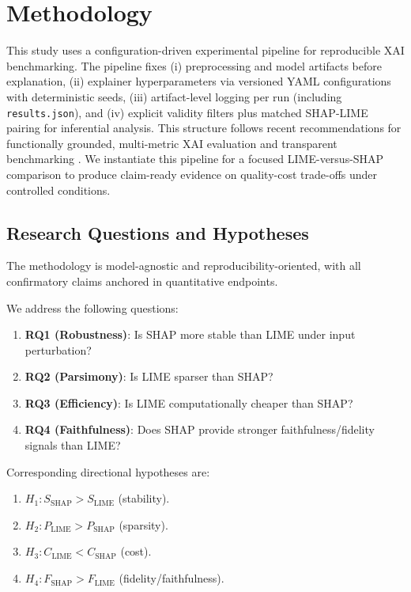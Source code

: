 \documentclass[twoside,11pt]{article}
\begin{document}
\section{Methodology}
This study uses a configuration-driven experimental pipeline for
reproducible XAI benchmarking. The pipeline fixes (i) preprocessing and
model artifacts before explanation, (ii) explainer hyperparameters via
versioned YAML configurations with deterministic seeds, (iii)
artifact-level logging per run (including \texttt{results.json}), and
(iv) explicit validity filters plus matched SHAP-LIME pairing for
inferential analysis. This structure follows recent recommendations for
functionally grounded, multi-metric XAI evaluation and transparent
benchmarking
\citep{canha2025benchmark,pawlicki2024metrics,agarwal2022openxai}. We
instantiate this pipeline for a focused LIME-versus-SHAP comparison to
produce claim-ready evidence on quality-cost trade-offs under controlled
conditions.

\subsection{Research Questions and Hypotheses}
The methodology is model-agnostic and reproducibility-oriented, with
all confirmatory claims anchored in quantitative endpoints.

We address the following questions:
\begin{enumerate}[leftmargin=*]
\item \textbf{RQ1 (Robustness)}: Is SHAP more stable than LIME under
input perturbation?
\item \textbf{RQ2 (Parsimony)}: Is LIME sparser than SHAP?
\item \textbf{RQ3 (Efficiency)}: Is LIME computationally cheaper than
SHAP?
\item \textbf{RQ4 (Faithfulness)}: Does SHAP provide stronger
faithfulness/fidelity signals than LIME?
\end{enumerate}

Corresponding directional hypotheses are:
\begin{enumerate}[leftmargin=*]
\item \(H_1: S_{\mathrm{SHAP}} > S_{\mathrm{LIME}}\) (stability).
\item \(H_2: P_{\mathrm{LIME}} > P_{\mathrm{SHAP}}\) (sparsity).
\item \(H_3: C_{\mathrm{LIME}} < C_{\mathrm{SHAP}}\) (cost).
\item \(H_4: F_{\mathrm{SHAP}} > F_{\mathrm{LIME}}\) (fidelity/faithfulness).
\end{enumerate}
\end{document}
